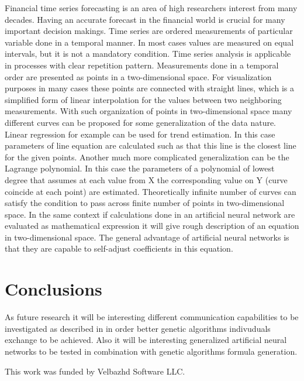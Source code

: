 \documentclass[graybox]{svmult}
\begin{document}
Financial time series forecasting is an area of high researchers interest \cite{nava01} from many decades. Having an accurate forecast in the financial world is crucial for many important decision makings. Time series are ordered measurements of particular variable done in a temporal manner. In most cases values are measured on equal intervals, but it is not a mandatory condition. Time series analysis is applicable in processes with clear repetition pattern. Measurements done in a temporal order are presented as points in a two-dimensional space. For visualization purposes in many cases these points are connected with straight lines, which is a simplified form of linear interpolation for the values between two neighboring measurements. With such organization of points in two-dimensional space many different curves can be proposed for some generalization of the data nature. Linear regression for example can be used for trend estimation. In this case parameters of line equation are calculated such as that this line is the closest line for the given points. Another much more complicated generalization can be the Lagrange polynomial. In this case the parameters of a polynomial of lowest degree that assumes at each value from X the corresponding value on Y (curve coincide at each point) are estimated. Theoretically infinite number of curves can satisfy the condition to pass across finite number of points in two-dimensional space. In the same context if calculations done in an artificial neural network are evaluated as mathematical expression it will give rough description of an equation in two-dimensional space. The general advantage of artificial neural networks is that they are capable to self-adjust coefficients in this equation. 

\section{Conclusions} \label{Conclusions}

As future research it will be interesting different communication capabilities to be investigated as described in \cite{alexandrov01} in order better genetic algorithms indivuduals exchange to be achieved. Also it will be interesting generalized artificial neural networks \cite{tashev01} to be tested in combination with genetic algorithms formula generation.

\begin{acknowledgement}
This work was funded by Velbazhd Software LLC.
\end{acknowledgement}
\end{document}
